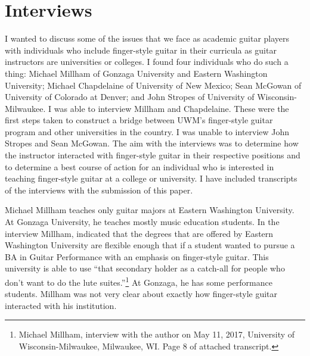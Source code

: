 \documentclass[12pt]{article}
\begin{document}
\section{Interviews}
\label{sec:interviews}
I wanted to discuss some of the issues that we face as academic guitar
players with individuals who include finger-style guitar in their
curricula as guitar instructors are universities or colleges. I found
four individuals who do such a thing: Michael Millham of Gonzaga
University and Eastern Washington University; Michael Chapdelaine of
University of New Mexico; Sean McGowan of University of Colorado at
Denver; and John Stropes of University of Wisconsin-Milwaukee. I was
able to interview Millham and Chapdelaine. These were the first steps
taken to construct a bridge between UWM's finger-style guitar program
and other universities in the country. I was unable to interview John
Stropes and Sean McGowan. The aim with the interviews was to determine
how the instructor interacted with finger-style guitar in their
respective positions and to determine a best course of action for an
individual who is interested in teaching finger-style guitar at a
college or university. I have included transcripts of the interviews
with the submission of this paper.

Michael Millham teaches only guitar majors at Eastern Washington
University. At Gonzaga University, he teaches mostly music education
students. In the interview Millham, indicated that the degrees that
are offered by Eastern Washington University are flexible enough that
if a student wanted to pursue a BA in Guitar Performance with an
emphasis on finger-style guitar. This university is able to use ``that
secondary holder as a catch-all for people who don't want to do the
lute suites.''\footnote{Michael Millham, interview with the author on
  May 11, 2017, University of Wisconsin-Milwaukee, Milwaukee, WI. Page
  8 of attached transcript.} At Gonzaga, he has some performance
students. Millham was not very clear about exactly how finger-style
guitar interacted with his institution.
\end{document}
